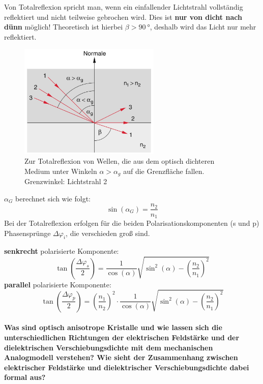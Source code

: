 \documentclass[a4paper, 11pt, ngerman, parskip=half-]{scrartcl}
\begin{document}
Von Totalreflexion spricht man, wenn ein einfallender Lichtstrahl vollständig reflektiert und nicht teilweise gebrochen wird.
Dies ist \textbf{nur von dicht nach dünn} möglich! Theoretisch ist hierbei $\beta > \SI{90}{\degree}$, deshalb wird das Licht nur mehr
reflektiert.
%
\begin{figure}[H]
    \centering
    \begin{samepage}
        \includegraphics[width=0.6\textwidth]{image/15/totalreflexion.jpg}
        \caption{Zur Totalreflexion von Wellen, die aus dem optisch
            dichteren Medium unter Winkeln $\alpha > \alpha_g$ auf die Grenzfläche fallen. Grenzwinkel: Lichtstrahl 2}
        \label{fig:totalreflexion}
    \end{samepage}
\end{figure}
%
$\alpha_G$ berechnet sich wie folgt:
%
\begin{equation}
    \label{eq:grenzwinkel_totalreflexion}
    \sin(\alpha_G) = \frac{n_2}{n_1}
\end{equation}
%
Bei der Totalreflexion erfolgen für die beiden Polarisationskomponenten (s und p) Phasensprünge $\Delta \varphi_i$, die verschieden groß sind.

\textbf{senkrecht} polarisierte Komponente:
%
\begin{equation}
    \label{eq:totalreflexion_s_polarisation}
    \tan(\frac{\Delta \varphi_s}{2}) = \frac{1}{\cos(\alpha)} \sqrt{\sin^2(\alpha) - \left(\frac{n_2}{n_1}\right)^2}
\end{equation}
%
\textbf{parallel} polarisierte Komponente:
%
\begin{equation}
    \label{eq:totalreflexion_p_polarisation}
    \tan(\frac{\Delta \varphi_p}{2}) = \left( \frac{n_1}{n_2} \right)^2 \cdot \frac{1}{\cos(\alpha)} \sqrt{\sin^2(\alpha) - \left(\frac{n_2}{n_1}\right)^2}
\end{equation}
%
\paragraph{Was sind optisch anisotrope Kristalle und wie lassen sich die unterschiedlichen Richtungen
    der elektrischen Feldstärke und der dielektrischen Verschiebungsdichte mit dem mechanischen Analogmodell
    verstehen? Wie sieht der Zusammenhang zwischen elektrischer Feldstärke und dielektrischer Verschiebungsdichte dabei formal aus?}~
\end{document}
